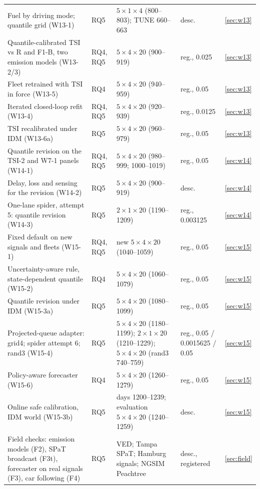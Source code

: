\begin{table}[t]
\begin{tabular}{@{}p{5.3cm}p{1.5cm}p{6.0cm}p{2.5cm}l@{}}
Fuel by driving mode; quantile grid (W13-1) & RQ5 & $5\times1\times4$ (800--803); TUNE 660--663 & desc. & \ref{sec:w13}\\
Quantile-calibrated TSI vs R and F1-B, two emission models (W13-2/3) & RQ4, RQ5 & $5\times4\times20$ (900--919) & reg., 0.025 & \ref{sec:w13}\\
Fleet retrained with TSI in force (W13-5) & RQ4 & $5\times4\times20$ (940--959) & reg., 0.05 & \ref{sec:w13}\\
Iterated closed-loop refit (W13-4) & RQ4, RQ5 & $5\times4\times20$ (920--939) & reg., 0.0125 & \ref{sec:w13}\\
TSI recalibrated under IDM (W13-6a) & RQ5 & $5\times4\times20$ (960--979) & reg., 0.05 & \ref{sec:w13}\\
Quantile revision on the TSI-2 and W7-1 panels (W14-1) & RQ4, RQ5 & $5\times4\times20$ (980--999; 1000--1019) & reg., 0.05 & \ref{sec:w14}\\
Delay, loss and sensing for the revision (W14-2) & RQ5 & $5\times4\times20$ (900--919) & desc. & \ref{sec:w14}\\
One-lane spider, attempt 5: quantile revision (W14-3) & RQ5 & $2\times1\times20$ (1190--1209) & reg., 0.003125 & \ref{sec:w14}\\
Fixed default on new signals and fleets (W15-1) & RQ4, RQ5 & new $5\times4\times20$ (1040--1059) & reg., 0.05 & \ref{sec:w15}\\
Uncertainty-aware rule, state-dependent quantile (W15-2) & RQ4 & $5\times4\times20$ (1060--1079) & reg., 0.05 & \ref{sec:w15}\\
Quantile revision under IDM (W15-3a) & RQ5 & $5\times4\times20$ (1080--1099) & reg., 0.05 & \ref{sec:w15}\\
Projected-queue adapter: grid4; spider attempt 6; rand3 (W15-4) & RQ5 & $5\times4\times20$ (1180--1199); $2\times1\times20$ (1210--1229); $5\times4\times20$ (rand3 740--759) & reg., 0.05 / 0.0015625 / 0.05 & \ref{sec:w15}\\
Policy-aware forecaster (W15-6) & RQ4 & $5\times4\times20$ (1260--1279) & reg., 0.05 & \ref{sec:w15}\\
Online safe calibration, IDM world (W15-3b) & RQ5 & days 1200--1239; evaluation $5\times4\times20$ (1240--1259) & desc. & \ref{sec:w15}\\
Field checks: emission models (F2), SPaT broadcast (F3t), forecaster on real signals (F3), car following (F4) & RQ5 & VED; Tampa SPaT; Hamburg signals; NGSIM Peachtree & desc., registered & \ref{sec:field}\\\bottomrule
\end{tabular}\end{table}

